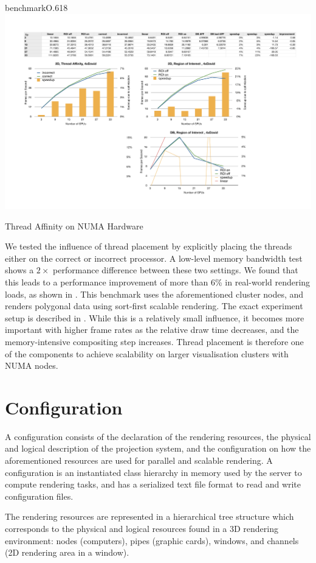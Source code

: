 \begin{wrapfloat}{benchmark}{O}{.618\textwidth}
 \includegraphics[width=.618\textwidth]{results/affinity.pdf}
 {\caption{\label{rNuma}Thread Affinity on NUMA Hardware}}
\end{wrapfloat}

We tested the influence of thread placement by explicitly placing the threads
either on the correct or incorrect processor. A low-level memory bandwidth test
shows a $2\times$ performance difference between these two settings. We found
that this leads to a performance improvement of more than 6\% in real-world
rendering loads, as shown in . This benchmark uses the
aforementioned cluster nodes, and renders polygonal data using sort-first
scalable rendering. The exact experiment setup is described in
\cite{EBAHMP:12}. While this is a relatively small influence, it becomes more
important with higher frame rates as the relative draw time decreases, and the
memory-intensive compositing step increases. Thread placement is therefore one
of the components to achieve scalability on larger visualisation clusters with
NUMA nodes.


\section{Configuration}

A configuration consists of the declaration of the rendering resources, the
physical and logical description of the projection system, and the
configuration on how the aforementioned resources are used for parallel and
scalable rendering. A configuration is an instantiated class hierarchy in
memory used by the server to compute rendering tasks, and has a serialized text
file format to read and write configuration files.

The rendering resources are represented in a hierarchical tree structure
which corresponds to the physical and logical resources found in a 3D
rendering environment: nodes (computers), pipes (graphic cards),
windows, and channels (2D rendering area in a window).

